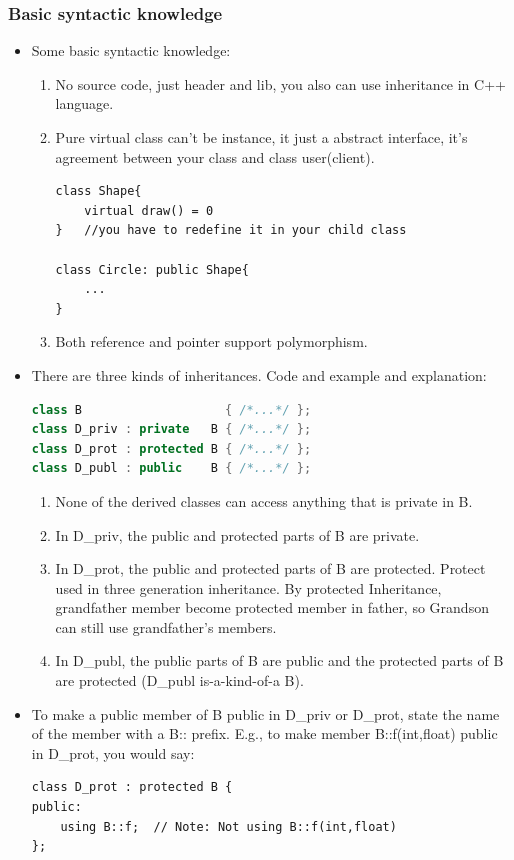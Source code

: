 \documentclass[a4paper,11pt,twoside]{book}
\begin{document}
\subsubsection{Basic syntactic knowledge}
\begin{itemize}

	\item Some basic syntactic knowledge:
	\begin{enumerate}
		\item No source code, just header and lib, you also can use inheritance in C++ language.
		
		\item Pure virtual class can't be instance, it just a abstract interface, it's agreement between your class and class user(client).
\begin{lstlisting}[numbers=none]
class Shape{
	virtual draw() = 0 
}	//you have to redefine it in your child class
			
class Circle: public Shape{
	...
}
\end{lstlisting}
		
		\item Both reference and pointer support polymorphism.
	\end{enumerate}
	
	\item 	There are three kinds of inheritances. Code and example and explanation:
\begin{lstlisting}[frame=single, language=c++]
class B                    { /*...*/ };
class D_priv : private   B { /*...*/ };
class D_prot : protected B { /*...*/ };
class D_publ : public    B { /*...*/ };
\end{lstlisting}
	
	\begin{enumerate}
		\item None of the derived classes can access anything that is private in B.
		
		\item In D\_priv, the public and protected parts of B are private.
		
		\item In D\_prot, the public and protected parts of B are protected. Protect used in three generation inheritance. By protected Inheritance, grandfather member become protected member in father, so Grandson can still use grandfather's members.
		
		\item In D\_publ, the public parts of  B are public and the protected parts of B are protected (D\_publ is-a-kind-of-a B).
		
	\end{enumerate}

	\item To make a public member of B public in D\_priv or D\_prot, state the name of the member with a B:: prefix. E.g., to make member B::f(int,float) public in D\_prot, you would say:
\begin{lstlisting}[numbers=none]
class D_prot : protected B {
public:
	using B::f;  // Note: Not using B::f(int,float)
};
\end{lstlisting}
\end{itemize}
\end{document}
